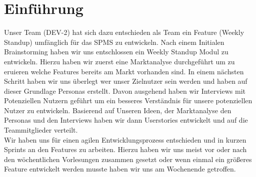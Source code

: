 \chapter{Einführung}

Unser Team (DEV-2) hat sich dazu entschieden als Team ein Feature (Weekly Standup) umfänglich für das \ac{SPMS} zu entwickeln. Nach einem Initialen Brainstorming haben wir uns entschlossen ein Weekly Standup Modul zu entwickeln. Hierzu haben wir zuerst eine Marktanalyse durchgeführt um zu eruieren welche Features bereits am Markt vorhanden sind. In einem nächsten Schritt haben wir uns überlegt wer unser Zielnutzer sein werden und haben auf dieser Grundlage Personas erstellt. Davon ausgehend haben wir Interviews mit Potenziellen Nutzern geführt um ein besseres Verständnis für unsere potenziellen Nutzer zu entwickeln. Basierend auf Unseren Ideen, der Marktanalyse den Personas und den Interviews haben wir dann Userstories entwickelt und auf die Teammitglieder verteilt. \\
Wir haben uns für einen agilen  Entwicklungsprozess entschieden und in kurzen Sprints an den Features zu arbeiten. Hierzu haben wir uns meist vor oder nach den wöchentlichen Vorlesungen zusammen gesetzt oder wenn einmal ein größeres Feature entwickelt werden musste haben wir uns am Wochenende getroffen. 